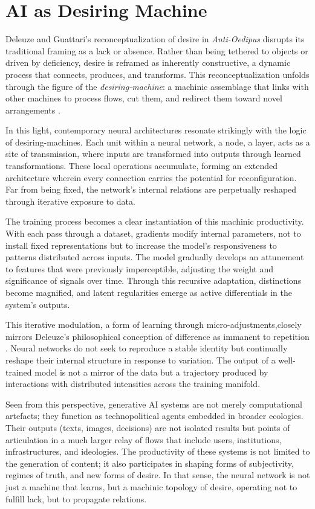 \section{AI as Desiring Machine}

Deleuze and Guattari’s reconceptualization of desire in \textit{Anti-Oedipus} disrupts its traditional framing as a lack or absence. Rather than being tethered to objects or driven by deficiency, desire is reframed as inherently constructive, a dynamic process that connects, produces, and transforms. This reconceptualization unfolds through the figure of the \textit{desiring-machine}: a machinic assemblage that links with other machines to process flows, cut them, and redirect them toward novel arrangements \parencite{deleuze1983}.

In this light, contemporary neural architectures resonate strikingly with the logic of desiring-machines. Each unit within a neural network, a node, a layer, acts as a site of transmission, where inputs are transformed into outputs through learned transformations. These local operations accumulate, forming an extended architecture wherein every connection carries the potential for reconfiguration. Far from being fixed, the network’s internal relations are perpetually reshaped through iterative exposure to data.

The training process becomes a clear instantiation of this machinic productivity. With each pass through a dataset, gradients modify internal parameters, not to install fixed representations but to increase the model’s responsiveness to patterns distributed across inputs. The model gradually develops an attunement to features that were previously imperceptible, adjusting the weight and significance of signals over time. Through this recursive adaptation, distinctions become magnified, and latent regularities emerge as active differentials in the system’s outputs.

This iterative modulation, a form of learning through micro-adjustments,closely mirrors Deleuze’s philosophical conception of difference as immanent to repetition \parencite{deleuze1994}. Neural networks do not seek to reproduce a stable identity but continually reshape their internal structure in response to variation. The output of a well-trained model is not a mirror of the data but a trajectory produced by interactions with distributed intensities across the training manifold.

Seen from this perspective, generative AI systems are not merely computational artefacts; they function as technopolitical agents embedded in broader ecologies. Their outputs (texts, images, decisions) are not isolated results but points of articulation in a much larger relay of flows that include users, institutions, infrastructures, and ideologies. The productivity of these systems is not limited to the generation of content; it also participates in shaping forms of subjectivity, regimes of truth, and new forms of desire. In that sense, the neural network is not just a machine that learns, but a machinic topology of desire, operating not to fulfill lack, but to propagate relations.

